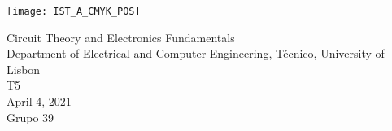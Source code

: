 
\thispagestyle {empty}

\texttt{[image: IST\_A\_CMYK\_POS]}

\begin{center}
    \vspace{1.0cm}

    \vspace{1cm}
    {\FontLb Circuit Theory and Electronics Fundamentals} \\ %
    \vspace{1cm}
    {\FontSn Department of Electrical and Computer Engineering, Técnico, University of Lisbon} \\ %
    \vspace{1cm}
    {\FontSn T5} \\
    \vspace{1cm}
    {\FontSn April 4, 2021} \\
    {\FontSn Grupo 39}
\end{center}

